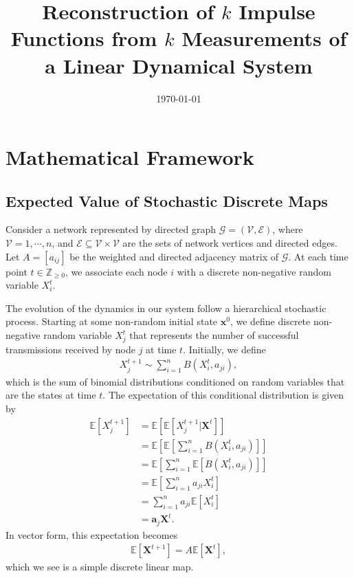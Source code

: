 \documentclass[superscriptaddress]{revtex4-1}
\newcommand{\mc}{\mathcal}
\begin{document}
\title{Reconstruction of $k$ Impulse Functions from $k$ Measurements of a Linear Dynamical System}
\date{\today}

\maketitle


\section{Mathematical Framework}
\subsection{Expected Value of Stochastic Discrete Maps}
Consider a network represented by directed graph $\mc G = (\mc V, \mc E)$, where $\mc V = {1, \dotsm, n}$, and $\mc E \subseteq \mc V \times \mc V$ are the sets of network vertices and directed edges. Let $A = [a_{ij}]$ be the weighted and directed adjacency matrix of $\mc G$. At each time point $t \in \mathbb{Z}_{\geq 0}$, we associate each node $i$ with a discrete non-negative random variable $X_i^t$.

The evolution of the dynamics in our system follow a hierarchical stochastic process. Starting at some non-random initial state $\bm{x}^0$, we define discrete non-negative random variable $X_{j}^t$ that represents the number of successful transmissions received by node $j$ at time $t$. Initially, we define
\begin{align*}
X_j^{t+1} \sim \sum_{i=1}^n B(X_i^{t},a_{ji}),
\end{align*}
which is the sum of binomial distributions conditioned on random variables that are the states at time $t$. The expectation of this conditional distribution is given by
\begin{align*}
\mathbb{E}[X_j^{t+1}] 
&= \mathbb{E}[\mathbb{E}[X_j^{t+1}|\bm{X}^t]]\\
&= \mathbb{E}[\mathbb{E}[\sum_{i=1}^n B(X_i^t,a_{ji})]]\\
&= \mathbb{E}[\sum_{i=1}^n \mathbb{E}[B(X_i^t,a_{ji})]]\\
&= \mathbb{E}[\sum_{i=1}^n a_{ji} X_i^t]\\
&= \sum_{i=1}^n a_{ji} \mathbb{E}[X_i^t]\\
&= \bm{a}_j \bm{X}^t.
\end{align*}
In vector form, this expectation becomes
\begin{align*}
\mathbb{E}[\bm{X}^{t+1}] = A\mathbb{E}[\bm{X}^t],
\end{align*}
which we see is a simple discrete linear map.
\end{document}
